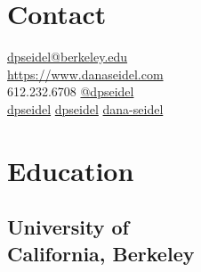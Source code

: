 \documentclass[]{deedy-resume-openfont}
\begin{document}
%
%
\lastupdated

%
%



%
%

\begin{minipage}[t]{0.32\textwidth} 

\section{Contact} 
\href{mailto:dpseidel@berkeley.edu}{\faEnvelope \hspace{2pt} dpseidel@berkeley.edu} \\
\href{https://www.danaseidel.com}{\faGlobe \hspace{2pt} https://www.danaseidel.com}\\
\faPhone \hspace{2pt} 612.232.6708 \hspace{2pt}  \href{https://twitter.com/dpseidel}{\faTwitter \hspace{1pt} @dpseidel} \\
\href{https://github.com/dpseidel}{\faGithub \hspace{2pt} dpseidel} \hspace{2pt}
\href{https://stackoverflow.com/users/9995814/dpseidel}{\faStackOverflow \hspace{2pt} dpseidel} \hspace{2pt}
\href{https://www.linkedin.com/in/dana-seidel/}{\faLinkedinSquare \hspace{2pt} dana-seidel} 
\sectionsep

\section{Education} 
\subsection{University of \\California, Berkeley}
\sectionsep


\end{minipage}
\end{document}
